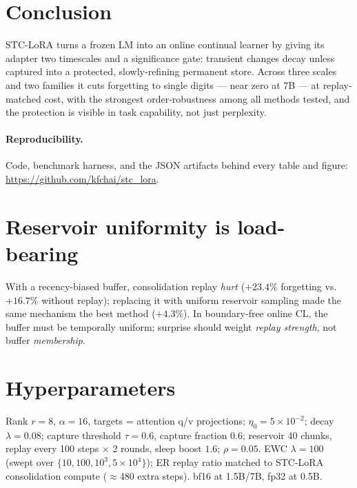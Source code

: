 \documentclass{article}
\newcommand{\stc}{STC-LoRA}
\begin{document}
\section{Conclusion}
\stc{} turns a frozen LM into an online continual learner by giving its adapter two timescales and a significance gate: transient changes decay unless captured into a protected, slowly-refining permanent store. Across three scales and two families it cuts forgetting to single digits --- near zero at 7B --- at replay-matched cost, with the strongest order-robustness among all methods tested, and the protection is visible in task capability, not just perplexity.

\paragraph{Reproducibility.} Code, benchmark harness, and the JSON artifacts behind every table and figure: \url{https://github.com/kfchai/stc_lora}. %




\appendix
\section{Reservoir uniformity is load-bearing}
With a recency-biased buffer, consolidation replay \emph{hurt} ($+23.4\%$ forgetting vs.\ $+16.7\%$ without replay); replacing it with uniform reservoir sampling \citep{vitter1985random} made the same mechanism the best method ($+4.3\%$). In boundary-free online CL, the buffer must be temporally uniform; surprise should weight \emph{replay strength}, not buffer \emph{membership}.

\section{Hyperparameters}
Rank $r{=}8$, $\alpha{=}16$, targets = attention q/v projections; $\eta_0{=}5{\times}10^{-2}$; decay $\lambda{=}0.08$; capture threshold $\tau{=}0.6$, capture fraction $0.6$; reservoir 40 chunks, replay every 100 steps $\times$ 2 rounds, sleep boost $1.6$; $\rho{=}0.05$. EWC $\lambda{=}100$ (swept over $\{10,100,10^3,5{\times}10^4\}$); ER replay ratio matched to \stc{} consolidation compute ($\approx$480 extra steps). bf16 at 1.5B/7B, fp32 at 0.5B.
\end{document}
